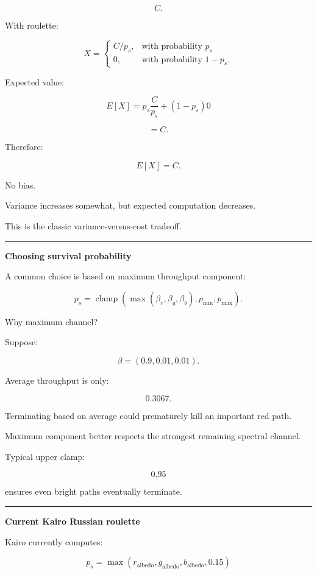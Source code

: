 \[
C.
\]

With roulette:

\[
X=
\begin{cases}
C/p_s, & \text{with probability }p_s\\
0, & \text{with probability }1-p_s.
\end{cases}
\]

Expected value:

\[
E[X]
=
p_s\frac{C}{p_s}
+
(1-p_s)0
\]

\[
=
C.
\]

Therefore:

\[
\boxed{
E[X]=C.
}
\]

No bias.

Variance increases somewhat, but expected computation decreases.

This is the classic variance-versus-cost tradeoff.

\begin{center}\rule{0.5\linewidth}{0.5pt}\end{center}

\textbf{Choosing survival probability}

A common choice is based on maximum throughput component:

\[
p_s
=
\operatorname{clamp}
(
\max(\beta_r,\beta_g,\beta_b),
p_{\min},
p_{\max}
).
\]

Why maximum channel?

Suppose:

\[
\beta=(0.9,0.01,0.01).
\]

Average throughput is only:

\[
0.3067.
\]

Terminating based on average could prematurely kill an important red path.

Maximum component better respects the strongest remaining spectral channel.

Typical upper clamp:

\[
0.95
\]

ensures even bright paths eventually terminate.

\begin{center}\rule{0.5\linewidth}{0.5pt}\end{center}

\textbf{Current Kairo Russian roulette}

Kairo currently computes:

\[
p_s
=
\max(
r_{\text{albedo}},
g_{\text{albedo}},
b_{\text{albedo}},
0.15
)
\]

